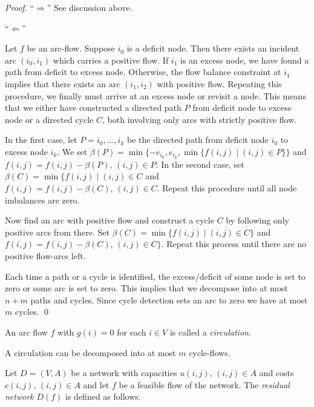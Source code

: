   \begin{proof}
   
  
  ``$\Rightarrow$'' See discussion above.
  
  ``$\Leftarrow$'' 
  
  Let $f$ be an arc-flow. Suppose $i_0$ is a deficit node. Then there
  exists an incident arc $(i_0,i_1)$ which carries a positive flow. If
  $i_1$ is an excess node, we have found a path from deficit to excess
  node. Otherwise, the flow balance constraint at $i_1$ implies that
  there exists an arc $(i_1,i_2)$ with positive flow. Repeating this
  procedure, we finally must arrive at an excess node or revisit a
  node. This means that we either have constructed a directed path $P$
  from deficit node to excess node or a directed cycle $C$, both
  involving only arcs with strictly positive flow.
  
  In the first case, let $P = i_0,\ldots,i_k$ be the directed path from
  deficit node $i_0$ to excess node $i_k$. We set $\beta(P) =
  \min\{-e_{i_0}, e_{i_k}, \min\{f{(i,j)} \mid (i,j) \in P\} \}$ and $f{(i,j)} =
  f{(i,j)} - \beta(P), \, (i,j) \in P$.  In the second case, set $\beta(C) =
  \min\{f{(i,j)} \mid (i,j) \in C$ and $f{(i,j)} = f{(i,j)} - \beta(C), \, (i,j)
  \in C$.  Repeat this procedure until all node imbalances are zero.
  
  Now find an arc with positive flow and construct a cycle $C$ by
  following only positive arcs from there. Set 
  $\beta(C) = \min\{f{(i,j)} \mid  (i,j) \in C\}$ and 
  $f{(i,j)} = f{(i,j)} - \beta(C),\, (i,j) \in C\}$. Repeat this process until
  there are no positive flow-arcs left. 

  Each time a path or a cycle is identified, the excess/deficit of
  some node is set to zero or some arc is set to zero. This implies
  that we decompose into at most $n+m$ paths and cycles. Since cycle
  detection sets an arc to zero we have at most $m$ cycles.  \qed
\end{proof}
  
  An arc flow $f$ with $g(i)=0$ for each $i \in V$ is called a
  \emph{circulation}. 
  
  \begin{corollary}
    A circulation can be decomposed into at most $m$ cycle-flows.
  \end{corollary}

  
  Let $D = (V,A)$ be a network with capacities 
  $u{(i,j)}, \,  (i,j) \in A$ and costs $c{(i,j)}, \, (i,j) \in A$ and let
  $f$ be a feasible flow of the network. The \emph{residual network} $D(f)$ is
  defined as follows.

